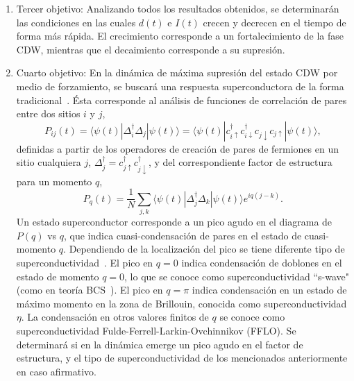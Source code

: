 \documentclass[a4paper,10pt]{article}
\begin{document}
\begin{enumerate}
\item Tercer objetivo: Analizando todos los resultados obtenidos, se determinar\'an las condiciones en las cuales $d(t)$ e $I(t)$ crecen y decrecen en el tiempo de forma m\'as r\'apida. El crecimiento corresponde a un fortalecimiento de la fase CDW, mientras que el decaimiento corresponde a su supresi\'on.

\item Cuarto objetivo: En la din\'amica de m\'axima supresi\'on del estado CDW por medio de forzamiento, se buscar\'a una respuesta superconductora de la forma tradicional~\cite{jonathan2016}. \'Esta corresponde al an\'alisis de funciones de correlaci\'on de pares entre dos sitios $i$ y $j$,
\begin{equation}
P_{ij}(t)=\langle\psi(t)|\Delta_i^{\dagger}\Delta_j|\psi(t)\rangle=\langle\psi(t)|c_{i\uparrow}^{\dagger}c_{i\downarrow}^{\dagger}c_{j\downarrow}c_{j\uparrow}|\psi(t)\rangle,
\end{equation}
definidas a partir de los operadores de creaci\'on de pares de fermiones en un sitio cualquiera $j$, $\Delta_{j}^{\dagger}=c_{j\uparrow}^{\dagger}c_{j\downarrow}^{\dagger}$, y del correspondiente factor de estructura para un momento $q$,
\begin{equation}
P_q(t)=\frac{1}{N}\sum_{j,k}\langle\psi(t)|\Delta_j^{\dagger}\Delta_k|\psi(t)\rangle e^{iq(j-k)}.
\end{equation}
Un estado superconductor corresponde a un pico agudo en el diagrama de $P(q)$ vs $q$, que indica cuasi-condensaci\'on de pares en el estado de cuasi-momento $q$. Dependiendo de la localizaci\'on del pico se tiene diferente tipo de superconductividad~\cite{kitamura2016prb}. El pico en $q=0$ indica condensaci\'on de doblones en el estado de momento $q=0$, lo que se conoce como superconductividad ``s-wave" (como en teor\'ia BCS~\cite{tinkham}). El pico en $q=\pi$ indica condensaci\'on en un estado de m\'aximo momento en la zona de Brillouin, conocida como superconductividad $\eta$. La condensaci\'on en otros valores finitos de $q$ se conoce como superconductividad Fulde-Ferrell-Larkin-Ovchinnikov (FFLO). Se determinar\'a si en la din\'amica emerge un pico agudo en el factor de estructura, y el tipo de superconductividad de los mencionados anteriormente en caso afirmativo. 


\end{enumerate}
\end{document}
